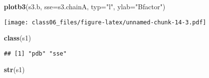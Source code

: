 \documentclass[
]{article}
\newenvironment{Shaded}{\begin{snugshade}}{\end{snugshade}}
\newcommand{\DataTypeTok}[1]{\textcolor[rgb]{0.13,0.29,0.53}{#1}}
\newcommand{\KeywordTok}[1]{\textcolor[rgb]{0.13,0.29,0.53}{\textbf{#1}}}
\newcommand{\NormalTok}[1]{#1}
\newcommand{\StringTok}[1]{\textcolor[rgb]{0.31,0.60,0.02}{#1}}
\begin{document}
\begin{Shaded}
\begin{Highlighting}[]
\KeywordTok{plotb3}\NormalTok{(s3.b, }\DataTypeTok{sse=}\NormalTok{s3.chainA, }\DataTypeTok{typ=}\StringTok{"l"}\NormalTok{, }\DataTypeTok{ylab=}\StringTok{"Bfactor"}\NormalTok{)}
\end{Highlighting}
\end{Shaded}

\texttt{[image: class06\_files/figure-latex/unnamed-chunk-14-3.pdf]}

\begin{Shaded}
\begin{Highlighting}[]
\KeywordTok{class}\NormalTok{(s1)}
\end{Highlighting}
\end{Shaded}

\begin{verbatim}
## [1] "pdb" "sse"
\end{verbatim}

\begin{Shaded}
\begin{Highlighting}[]
\KeywordTok{str}\NormalTok{(s1)}
\end{Highlighting}
\end{Shaded}
\end{document}
